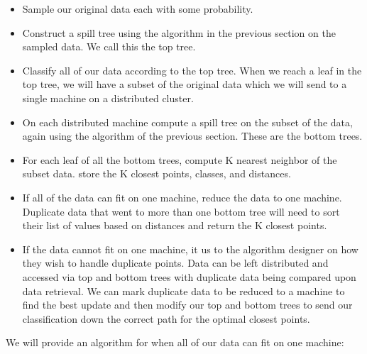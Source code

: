 \begin{itemize}
\item Sample our original data each with some probability.
\item Construct a spill tree using the algorithm in the previous section on the 
sampled data. We call this the top tree.
\item Classify all of our data according to the top tree. When we reach a 
leaf in the top tree, we will have a subset of the original data which we will 
send to a single machine on a distributed cluster.
\item On each distributed machine compute a spill tree on the subset of the 
data, again using the algorithm of the previous section. These are the bottom 
trees.
\item For each leaf of all the bottom trees, compute K nearest neighbor of the 
subset data. store the K closest points, classes, and distances.
\item If all of the data can fit on one machine, reduce the data to one 
machine. Duplicate data that went to more than one bottom tree will need to 
sort their list of values based on distances and return the K closest points.
\item If the data cannot fit on one machine, it us to the algorithm designer on 
how they wish to handle duplicate points. Data can be left distributed and 
accessed via top and bottom trees with duplicate data being compared upon data 
retrieval. We can mark duplicate data to be reduced to a machine to find the 
best update and then modify our top and bottom trees to send our classification 
down the correct path for the optimal closest points.
\end{itemize}

\newpage

\vspace{5 mm}
\noindent
We will provide an algorithm for when all of our data can fit on one machine:

